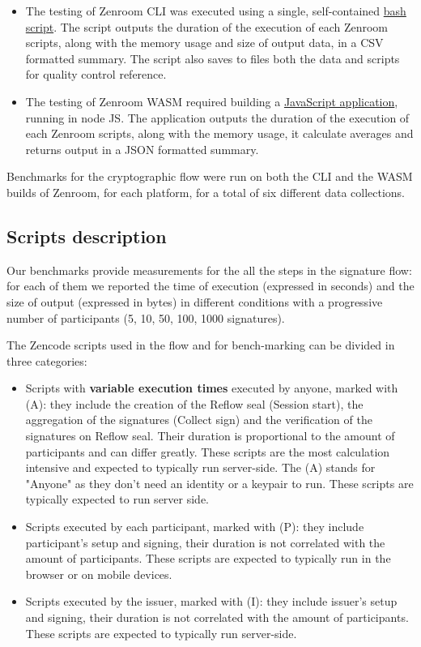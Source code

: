 \documentclass[twocolumn]{article}
\begin{document}
\begin{itemize}
\item The testing of Zenroom CLI was executed using a single, self-contained \href{https://github.com/dyne/Zenroom/blob/master/test/zencode_reflow/run-recursive.sh}{bash script}. The script outputs the duration of the execution of each Zenroom scripts, along with the memory usage and size of output data, in a CSV formatted summary. The script also saves to files both the data and scripts for quality control reference.

\item The testing of Zenroom WASM required building a \href{https://github.com/dyne/Reflow-Zencode-WASM-benchmark}{JavaScript application}, running in node JS. The application outputs the duration of the execution of each Zenroom scripts, along with the memory usage, it calculate averages and returns output in a JSON formatted summary.
\end{itemize}

Benchmarks for the cryptographic flow were run on both the CLI and the WASM builds of Zenroom, for each platform, for a total of six different data collections. 

\subsection*{Scripts description}

Our benchmarks provide measurements for the all the steps in the signature flow: for each of them we reported the time of execution (expressed in seconds) and the size of output (expressed in bytes) in different conditions with a progressive number of participants (5, 10, 50, 100, 1000 signatures).

The Zencode scripts used in the flow and for bench-marking can be divided in three categories: 

\begin{itemize}
\item Scripts with \textbf{variable execution times} executed by anyone, marked with (A): they include the creation of the Reflow seal (Session start), the aggregation of the signatures (Collect sign) and the verification of the signatures on Reflow seal. Their duration is proportional to the amount of participants and can differ greatly. These scripts are the most calculation intensive and expected to typically run server-side. The (A) stands for "Anyone" as they don't need an identity or a keypair to run. These scripts are typically expected to run server side.

\item Scripts executed by each participant, marked with (P): they include participant's setup and signing, their duration is not correlated with the amount of participants. These scripts are expected to typically run in the browser or on mobile devices.

\item Scripts executed by the issuer, marked with (I): they include issuer's setup and signing, their duration is not correlated with the amount of participants. These scripts are expected to typically run server-side.
\end{itemize}
\end{document}
